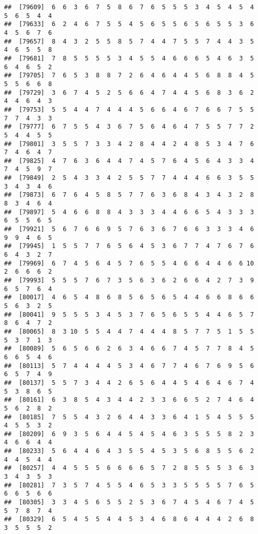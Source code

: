 \documentclass[
]{book}
\begin{document}
\begin{verbatim}
##  [79609]  6  6  3  6  7  5  8  6  7  6  5  5  5  3  4  5  4  5  4  5  6  5  4  4
##  [79633]  6  2  4  6  7  5  5  4  5  6  5  5  6  5  6  5  5  3  6  4  5  6  7  6
##  [79657]  8  4  3  2  5  5  8  5  7  4  4  7  5  5  7  4  4  3  5  4  6  5  5  8
##  [79681]  7  8  5  5  5  5  3  4  5  5  4  6  6  6  5  4  6  3  5  6  4  6  5  2
##  [79705]  7  6  5  3  8  8  7  2  6  4  6  4  4  5  6  8  8  4  5  5  5  6  6  8
##  [79729]  3  6  7  4  5  2  5  6  6  4  7  4  4  5  6  8  3  6  2  4  4  6  4  3
##  [79753]  5  5  4  4  7  4  4  4  5  6  6  4  6  7  6  6  7  5  5  7  7  4  3  3
##  [79777]  6  7  5  5  4  3  6  7  5  6  4  6  4  7  5  5  7  7  2  5  4  4  5  5
##  [79801]  3  5  5  7  3  3  4  2  8  4  4  2  4  8  5  3  4  7  6  7  4  6  4  7
##  [79825]  4  7  6  3  6  4  4  7  4  5  7  6  4  5  6  4  3  3  4  7  4  5  9  7
##  [79849]  2  5  4  3  3  4  2  5  5  7  7  4  4  4  6  6  3  5  5  3  4  3  4  6
##  [79873]  6  7  6  4  5  8  5  7  7  6  3  6  8  4  3  4  3  2  8  8  3  4  6  4
##  [79897]  5  4  6  6  8  8  4  3  3  3  4  4  6  6  5  4  3  3  3  6  5  5  6  5
##  [79921]  5  6  7  6  6  9  5  7  6  3  6  7  6  6  3  3  3  4  6  9  9  4  6  5
##  [79945]  1  5  5  7  7  6  5  6  4  5  3  6  7  7  4  7  6  7  6  6  4  3  2  7
##  [79969]  6  7  4  5  6  4  5  7  6  5  5  4  6  6  4  4  6  6 10  2  6  6  6  2
##  [79993]  5  5  5  7  6  7  3  5  6  3  6  2  6  6  4  2  7  3  9  6  5  7  6  4
##  [80017]  4  6  5  4  8  6  8  5  6  5  6  5  4  4  6  6  8  6  6  5  6  3  2  5
##  [80041]  9  5  5  5  3  4  5  3  7  6  5  6  5  5  4  4  6  5  7  8  6  4  7  2
##  [80065]  8  3 10  5  5  4  4  7  4  4  4  8  5  7  7  5  1  5  5  5  3  7  1  3
##  [80089]  5  6  5  6  6  2  6  3  4  6  6  7  4  5  7  7  8  4  5  6  6  5  4  6
##  [80113]  5  7  4  4  4  4  5  3  4  6  7  7  4  6  7  6  9  5  6  6  5  7  4  9
##  [80137]  5  5  7  3  4  4  2  6  5  6  4  4  5  4  6  4  6  7  4  5  3  8  6  5
##  [80161]  6  3  8  5  4  3  4  4  2  3  3  6  6  5  2  7  4  6  4  5  6  2  8  2
##  [80185]  7  5  5  4  3  2  6  4  4  3  3  6  4  1  5  4  5  5  5  4  5  5  3  2
##  [80209]  6  9  3  5  6  4  4  5  4  5  4  6  3  5  5  5  8  2  3  4  6  6  4  4
##  [80233]  5  6  4  4  6  4  3  5  5  4  5  3  5  6  8  5  5  6  2  4  4  5  4  4
##  [80257]  4  4  5  5  5  6  6  6  6  5  7  2  8  5  5  5  3  6  3  3  4  3  5  3
##  [80281]  7  3  5  7  4  5  5  4  6  5  3  3  5  5  5  5  7  6  5  6  6  5  6  6
##  [80305]  3  3  4  5  6  5  5  2  5  3  6  7  4  5  4  6  7  4  5  5  7  8  7  4
##  [80329]  6  5  4  5  5  4  4  5  3  4  6  8  6  4  4  4  2  6  8  3  5  5  5  2

\end{verbatim}
\end{document}
